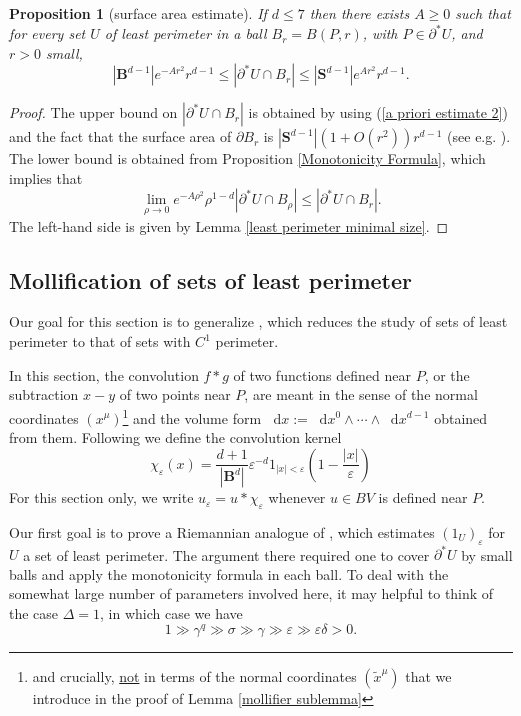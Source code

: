 \documentclass[reqno,10pt]{amsart}
\newcommand{\Sph}{\mathbf S}
\newcommand{\Ball}{\mathbf{B}}
\newcommand*\dif{\mathop{}\!\mathrm{d}}
\newtheorem{proposition}[theorem]{Proposition}
\theoremstyle{definition}
\numberwithin{equation}{section}
\begin{document}
\begin{proposition}[surface area estimate]\label{doubling dimension}
If $d \leq 7$ then there exists $A \geq 0$ such that for every set $U$ of least perimeter in a ball $B_r = B(P, r)$, with $P \in \partial^* U$, and $r > 0$ small,
$$|\Ball^{d - 1}|e^{-Ar^2}r^{d - 1} \leq |\partial^*U \cap B_r| \leq |\Sph^{d - 1}|e^{Ar^2} r^{d - 1}.$$
\end{proposition}
\begin{proof}
The upper bound on $|\partial^* U \cap B_r|$ is obtained by using (\ref{a priori estimate 2}) and the fact that the surface area of $\partial B_r$ is $|\Sph^{d - 1}|(1 + O(r^2))r^{d - 1}$ (see e.g. \cite{gray1974volume}).
The lower bound is obtained from Proposition \ref{Monotonicity Formula}, which implies that
$$\lim_{\rho \to 0} e^{-A\rho^2} \rho^{1 - d} |\partial^* U \cap B_\rho| \leq |\partial^* U \cap B_r|.$$
The left-hand side is given by Lemma \ref{least perimeter minimal size}.
\end{proof}

\subsection{Mollification of sets of least perimeter}
Our goal for this section is to generalize \cite[Lemma 7.5]{Giusti77}, which reduces the study of sets of least perimeter to that of sets with $C^1$ perimeter.

In this section, the convolution $f * g$ of two functions defined near $P$, or the subtraction $x - y$ of two points near $P$, are meant in the sense of the normal coordinates $(x^\mu)$\footnote{and crucially, \underline{not} in terms of the normal coordinates $(\tilde x^\mu)$ that we introduce in the proof of Lemma \ref{mollifier sublemma}} and the volume form $\dif x := \dif x^0 \wedge \cdots \wedge \dif x^{d - 1}$ obtained from them. Following \cite[Chapter 7]{Giusti77} we define the convolution kernel
$$\chi_\varepsilon(x) = \frac{d + 1}{|\Ball^d|} \varepsilon^{-d}1_{|x| < \varepsilon} \left(1 - \frac{|x|}{\varepsilon}\right)$$
For this section only, we write $u_\varepsilon = u * \chi_\varepsilon$ whenever $u \in BV$ is defined near $P$.

Our first goal is to prove a Riemannian analogue of \cite[Theorem 7.3]{Giusti77}, which estimates $(1_U)_\varepsilon$ for $U$ a set of least perimeter.
The argument there required one to cover $\partial^* U$ by small balls and apply the monotonicity formula in each ball.
To deal with the somewhat large number of parameters involved here, it may helpful to think of the case $\Delta = 1$, in which case we have
$$1 \gg \gamma^q \gg \sigma \gg \gamma \gg \varepsilon \gg \varepsilon \delta > 0.$$
\end{document}
